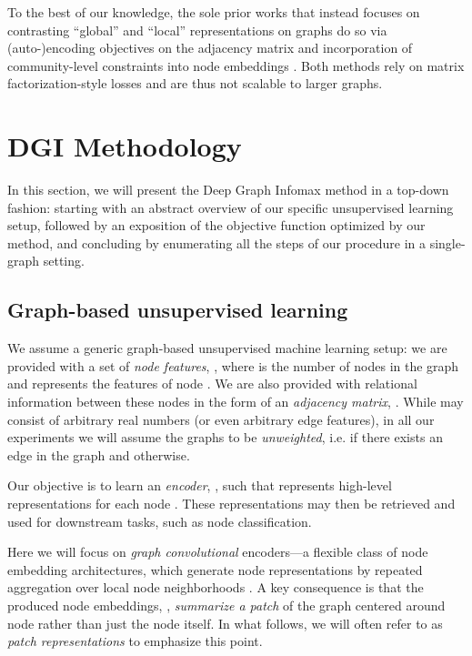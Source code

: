 \documentclass{article} \usepackage{iclr2019_conference,times}
\begin{document}
To the best of our knowledge, the sole prior works that instead focuses on contrasting ``global'' and ``local'' representations on graphs do so via (auto-)encoding objectives on the adjacency matrix \citep{wang2016structural} and incorporation of community-level constraints into node embeddings \citep{wang2017community}. Both methods rely on matrix factorization-style losses and are thus not scalable to larger graphs. 

\section{DGI Methodology}

In this section, we will present the Deep Graph Infomax method in a top-down fashion: starting with an abstract overview of our specific unsupervised learning setup, followed by an exposition of the objective function optimized by our method, and concluding by enumerating all the steps of our procedure in a single-graph setting. 

\subsection{Graph-based unsupervised learning}

We assume a generic graph-based unsupervised machine learning setup: we are provided with a set of \emph{node features}, , where  is the number of nodes in the graph and  represents the features of node . We are also provided with relational information between these nodes in the form of an \emph{adjacency matrix}, . While  may consist of arbitrary real numbers (or even arbitrary edge features), in all our experiments we will assume the graphs to be \emph{unweighted}, i.e.  if there exists an edge  in the graph and  otherwise.

Our objective is to learn an \emph{encoder}, , such that  represents high-level representations  for each node . These representations may then be retrieved and used for downstream tasks, such as node classification.

Here we will focus on \emph{graph convolutional} encoders---a flexible class of node embedding architectures, which generate node representations by repeated aggregation over local node neighborhoods \citep{gilmer2017neural}.
A key consequence is that the produced node embeddings, , \emph{summarize a patch} of the graph centered around node  rather than just the node itself. In what follows, we will often refer to  as {\em patch representations} to emphasize this point.
\end{document}
